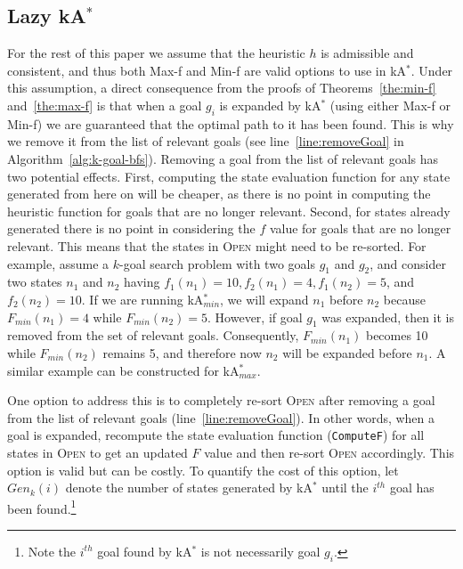 \documentclass{aicom2e}
\newcommand{\kgs}{$k$-goal search}
\newcommand{\kastar}{kA$^*$}
\newcommand{\kastarmin}{kA$^*_{min}$}
\newcommand{\kastarmax}{kA$^*_{max}$}
\newcommand{\minf}{Min-f}
\newcommand{\maxf}{Max-f}
\newcommand{\open}{\textsc{Open}}
\begin{document}
\subsection{Lazy \kastar{}}
\label{sec:lazy}

For the rest of this paper we assume that the heuristic $h$ is admissible and consistent, and thus both \maxf{} and \minf{} are valid options to use in \kastar{}. Under this assumption, a direct consequence from the proofs of Theorems~\ref{the:min-f} and~\ref{the:max-f} is that when a goal $g_i$ is expanded by \kastar{} (using either \maxf{} or \minf{}) we are guaranteed that the optimal path to it has been found. This is why we remove it from the list of relevant goals (see line~\ref{line:removeGoal} in Algorithm~\ref{alg:k-goal-bfs}). Removing a goal from the list of relevant goals has two potential effects. First, computing the state evaluation function for any state generated from here on will be cheaper, as there is no point in computing the heuristic function for goals that are no longer relevant. Second, for states already generated there is no point in considering the $f$ value for goals that are no longer relevant. This means that the states in \open{} might need to be re-sorted. For example, assume a \kgs{} problem with two goals $g_1$ and $g_2$, and consider two states $n_1$ and $n_2$ having $f_1(n_1)=10, f_2(n_1)=4, f_1(n_2)=5$, and $f_2(n_2)=10$. If we are running \kastarmin{}, we will expand $n_1$ before $n_2$ because $F_{min}(n_1)=4$ while $F_{min}(n_2)=5$. However, if goal $g_1$ was expanded, then it is removed from the set of relevant goals. Consequently, $F_{min}(n_1)$ becomes 10 while $F_{min}(n_2)$ remains 5, and therefore now $n_2$ will be expanded before $n_1$. A similar example can be constructed for \kastarmax{}.



One option to address this is to completely re-sort \open{} after removing a goal from the list of relevant goals (line~\ref{line:removeGoal}). 
In other words, when a goal is expanded, recompute the state evaluation function ({\tt ComputeF}) for all states in \open{} to get an updated $F$ value and then  re-sort \open{} accordingly. 
This option is valid but can be costly. To quantify the cost of this option, 
let $Gen_k(i)$ denote the number of states generated by \kastar{} until the $i^{th}$ goal has been found.\footnote{Note the $i^{th}$ goal found by \kastar{} is not necessarily goal $g_i$.} 
\end{document}
